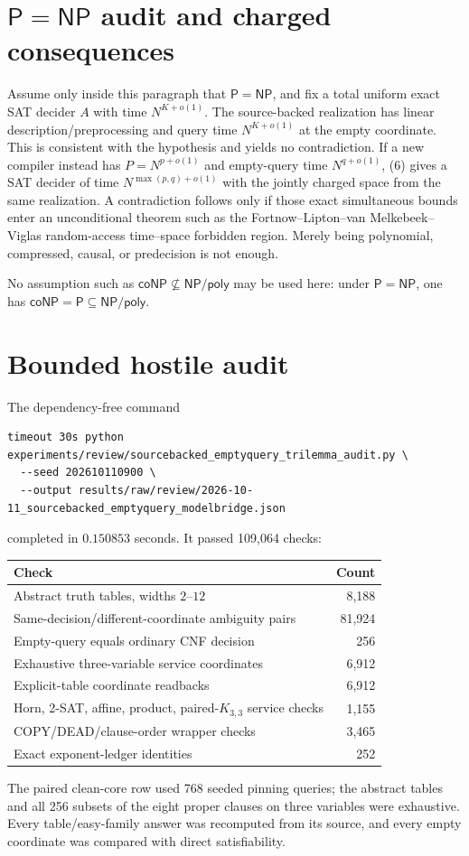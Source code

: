 \documentclass[11pt]{article}
\begin{document}
\section{$\mathsf P=\mathsf{NP}$ audit and charged consequences}

Assume only inside this paragraph that $\mathsf P=\mathsf{NP}$, and fix a
total uniform exact SAT decider $A$ with time $N^{K+o(1)}$.  The source-backed
realization has linear description/preprocessing and query time
$N^{K+o(1)}$ at the empty coordinate.  This is consistent with the
hypothesis and yields no contradiction.  If a new compiler instead has
$P=N^{p+o(1)}$ and empty-query time $N^{q+o(1)}$, (6) gives a SAT decider of
time $N^{\max(p,q)+o(1)}$ with the jointly charged space from the same
realization.  A contradiction follows only if those exact simultaneous
bounds enter an unconditional theorem such as the Fortnow--Lipton--van
Melkebeek--Viglas random-access time--space forbidden region.  Merely being
polynomial, compressed, causal, or predecision is not enough.

No assumption such as $\mathsf{coNP}\not\subseteq\mathsf{NP/poly}$ may be
used here: under $\mathsf P=\mathsf{NP}$, one has
$\mathsf{coNP}=\mathsf P\subseteq\mathsf{NP/poly}$.

\section{Bounded hostile audit}

The dependency-free command
\begin{verbatim}
timeout 30s python experiments/review/sourcebacked_emptyquery_trilemma_audit.py \
  --seed 202610110900 \
  --output results/raw/review/2026-10-11_sourcebacked_emptyquery_modelbridge.json
\end{verbatim}
completed in $0.150853$ seconds.  It passed 109,064 checks:
\begin{center}
\begin{tabular}{lr}
\toprule
Check & Count\\
\midrule
Abstract truth tables, widths $2$--$12$ & 8,188\\
Same-decision/different-coordinate ambiguity pairs & 81,924\\
Empty-query equals ordinary CNF decision & 256\\
Exhaustive three-variable service coordinates & 6,912\\
Explicit-table coordinate readbacks & 6,912\\
Horn, 2-SAT, affine, product, paired-$K_{3,3}$ service checks & 1,155\\
COPY/DEAD/clause-order wrapper checks & 3,465\\
Exact exponent-ledger identities & 252\\
\bottomrule
\end{tabular}
\end{center}
The paired clean-core row used 768 seeded pinning queries; the abstract tables
and all 256 subsets of the eight proper clauses on three variables were
exhaustive.  Every table/easy-family answer was recomputed from its source,
and every empty coordinate was compared with direct satisfiability.
\end{document}
